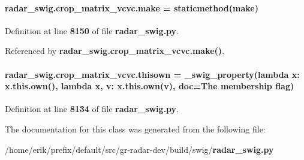 \paragraph[{make}]{\setlength{\rightskip}{0pt plus 5cm}radar\+\_\+swig.\+crop\+\_\+matrix\+\_\+vcvc.\+make = staticmethod(make)\hspace{0.3cm}{\ttfamily [static]}}\label{classradar__swig_1_1crop__matrix__vcvc_a9db5a34fe5818d5968bdf41cdf3bed53}


Definition at line {\bf 8150} of file {\bf radar\+\_\+swig.\+py}.



Referenced by {\bf radar\+\_\+swig.\+crop\+\_\+matrix\+\_\+vcvc.\+make()}.

\paragraph[{thisown}]{\setlength{\rightskip}{0pt plus 5cm}radar\+\_\+swig.\+crop\+\_\+matrix\+\_\+vcvc.\+thisown = {\bf \+\_\+swig\+\_\+property}(lambda x\+: x.\+this.\+own(), lambda {\bf x}, v\+: x.\+this.\+own(v), doc=\textquotesingle{}The membership flag\textquotesingle{})\hspace{0.3cm}{\ttfamily [static]}}\label{classradar__swig_1_1crop__matrix__vcvc_a040fba0b2f1efb4f66b6a8fa3c0037ec}


Definition at line {\bf 8134} of file {\bf radar\+\_\+swig.\+py}.



The documentation for this class was generated from the following file\+:\begin{DoxyCompactItemize}
\item 
/home/erik/prefix/default/src/gr-\/radar-\/dev/build/swig/{\bf radar\+\_\+swig.\+py}\end{DoxyCompactItemize}
